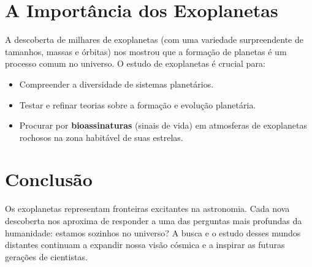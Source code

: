 \documentclass{article}
\begin{document}
\section{A Importância dos Exoplanetas}
A descoberta de milhares de exoplanetas (com uma variedade surpreendente de tamanhos, massas e órbitas) nos mostrou que a formação de planetas é um processo comum no universo. O estudo de exoplanetas é crucial para:
\begin{itemize}
    \item Compreender a diversidade de sistemas planetários.
    \item Testar e refinar teorias sobre a formação e evolução planetária.
    \item Procurar por \textbf{bioassinaturas} (sinais de vida) em atmosferas de exoplanetas rochosos na zona habitável de suas estrelas.
\end{itemize}

\section{Conclusão}
Os exoplanetas representam fronteiras excitantes na astronomia. Cada nova descoberta nos aproxima de responder a uma das perguntas mais profundas da humanidade: estamos sozinhos no universo? A busca e o estudo desses mundos distantes continuam a expandir nossa visão cósmica e a inspirar as futuras gerações de cientistas.
\end{document}
